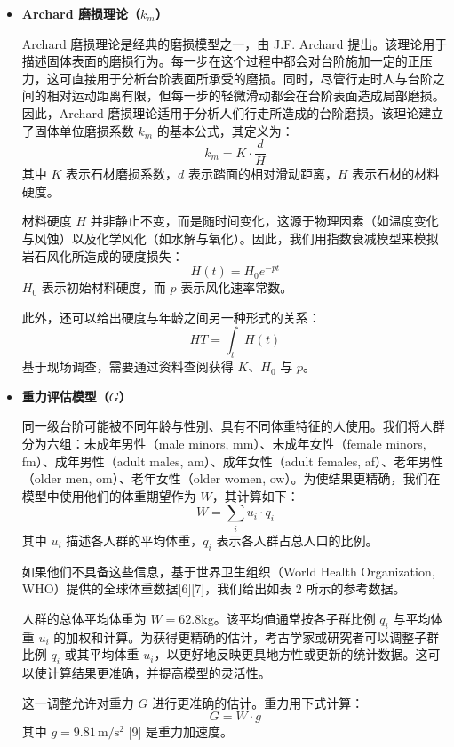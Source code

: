\documentclass[11pt,a4paper]{ctexart}
\begin{document}
\begin{itemize}
\item \textbf{Archard 磨损理论（\(k_m\)）}

Archard 磨损理论是经典的磨损模型之一，由 J.F. Archard 提出。该理论用于描述固体表面的磨损行为。每一步在这个过程中都会对台阶施加一定的正压力，这可直接用于分析台阶表面所承受的磨损。同时，尽管行走时人与台阶之间的相对运动距离有限，但每一步的轻微滑动都会在台阶表面造成局部磨损。因此，Archard 磨损理论适用于分析人们行走所造成的台阶磨损。该理论建立了固体单位磨损系数 \(k_m\) 的基本公式，其定义为：
\begin{equation}
k_m=K\cdot\frac{d}{H} \tag{3.3}
\end{equation}
其中 \(K\) 表示石材磨损系数，\(d\) 表示踏面的相对滑动距离，\(H\) 表示石材的材料硬度。

材料硬度 \(H\) 并非静止不变，而是随时间变化，这源于物理因素（如温度变化与风蚀）以及化学风化（如水解与氧化）。因此，我们用指数衰减模型来模拟岩石风化所造成的硬度损失：
\begin{equation}
H(t)=H_0e^{-pt} \tag{3.4}
\end{equation}
\(H_0\) 表示初始材料硬度，而 \(p\) 表示风化速率常数。

此外，还可以给出硬度与年龄之间另一种形式的关系：
\begin{equation}
HT=\int_t H(t) \tag{3.5}
\end{equation}
基于现场调查，需要通过资料查阅获得 \(K\)、\(H_0\) 与 \(p\)。

\item \textbf{重力评估模型（\(G\)）}

同一级台阶可能被不同年龄与性别、具有不同体重特征的人使用。我们将人群分为六组：未成年男性（male minors, mm）、未成年女性（female minors, fm）、成年男性（adult males, am）、成年女性（adult females, af）、老年男性（older men, om）、老年女性（older women, ow）。为使结果更精确，我们在模型中使用他们的体重期望作为 \(W\)，其计算如下：
\begin{equation}
W=\sum_i u_i\cdot q_i \tag{3.6}
\end{equation}
其中 \(u_i\) 描述各人群的平均体重，\(q_i\) 表示各人群占总人口的比例。

如果他们不具备这些信息，基于世界卫生组织（World Health Organization, WHO）提供的全球体重数据[6][7]，我们给出如表 2 所示的参考数据。

人群的总体平均体重为 \(W=62.8\)kg。该平均值通常按各子群比例 \(q_i\) 与平均体重 \(u_i\) 的加权和计算。为获得更精确的估计，考古学家或研究者可以调整子群比例 \(q_i\) 或其平均体重 \(u_i\)，以更好地反映更具地方性或更新的统计数据。这可以使计算结果更准确，并提高模型的灵活性。

这一调整允许对重力 \(G\) 进行更准确的估计。重力用下式计算：
\begin{equation}
G=W\cdot g \tag{3.7}
\end{equation}
其中 \(g=9.81\,\mathrm{m/s^2}\) [9] 是重力加速度。
\end{itemize}
\end{document}
